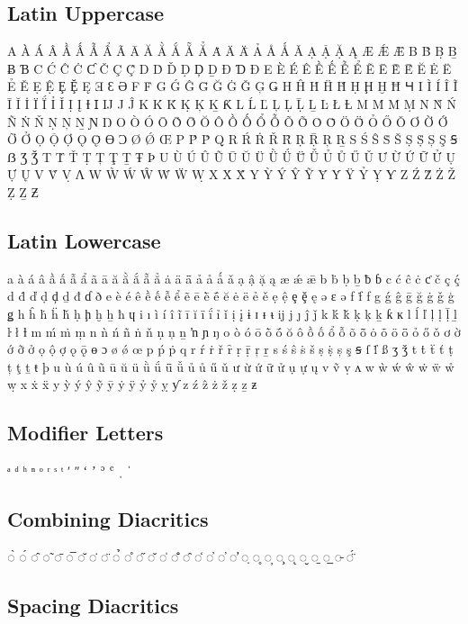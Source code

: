 
\subsection{Latin Uppercase}

A À Á Â Ầ Ấ Ẫ Ẩ Ã Ā Ă Ằ Ắ Ẵ Ẳ Ȧ Ä Ǟ Ả Å Ǻ Ǎ Ạ Ậ Ặ Ą Æ Ǽ Ǣ B Ḃ Ḅ Ḇ Ƀ Ɓ C Ć Ĉ Ċ Ƈ Č Ç Ḉ D Ḋ Ď Ḍ Ḑ Ḏ Đ Ɗ Ð E È É Ê Ề Ế Ễ Ể Ẽ Ē Ḕ Ḗ Ĕ Ė Ë Ẻ Ě Ẹ Ệ Ȩ Ḝ Ę Ǝ Ɛ Ə F Ḟ G Ǵ Ĝ Ḡ Ğ Ġ Ǧ Ģ Ǥ H Ĥ Ḣ Ḧ Ȟ Ḥ Ḩ Ḫ Ħ Ɥ I Ì Í Î Ĩ Ī Ĭ İ Ï Ḯ Ỉ Ǐ Ị Į Ɨ Ɪ Ĳ J Ĵ K Ḱ Ǩ Ḳ Ķ Ḵ Ƙ L Ĺ Ľ Ļ Ḷ Ḹ Ḻ Ŀ Ł Ƚ M Ḿ Ṁ Ṃ N Ǹ Ń Ñ Ṅ Ň Ṇ Ņ Ṉ Ɲ Ŋ O Ò Ó Ō Ṑ Ṓ Ŏ Ô Ồ Ố Ổ Ỗ Õ Ȭ Ȯ Ȱ Ö Ȫ Ỏ Ő Ǒ Ơ Ờ Ớ Ỡ Ở Ọ Ộ Ợ Ǫ Ǭ Ɵ Ɔ Ø Ǿ Œ P Ṕ Ṗ Q R Ŕ Ṙ Ř Ȓ Ṛ Ṝ Ŗ Ṟ S Ś Ŝ Ṡ Š Ṣ Ṩ Ș Ş Ꞩ ẞ Ʒ Ǯ T Ṫ Ť Ṭ Ț Ţ Ṯ Ŧ Þ U Ù Ú Û Ũ Ū Ŭ Ü Ǜ Ǘ Ǖ Ǚ Ủ Ů Ű Ǔ Ư Ừ Ứ Ữ Ử Ụ Ự Ų V Ṽ Ṿ Ʌ W Ẁ Ẃ Ŵ Ẇ Ẅ Ẉ X Ẋ Ẍ Y Ỳ Ý Ŷ Ỹ Ȳ Ẏ Ÿ Ỷ Ỵ Ƴ Z Ź Ẑ Ż Ž Ẓ Ẕ Ƶ

\subsection{Latin Lowercase}

a à á â ầ ấ ẫ ẩ ã ā ă ằ ắ ẵ ẳ ȧ ä ǟ ả å ǻ ǎ ạ ậ ặ ą æ ǽ ǣ b ḃ ḅ ḇ ƀ ɓ c ć ĉ ċ ƈ č ç ḉ d ḋ ď ḍ ḑ ḏ đ ɗ ð e è é ê ề ế ễ ể ẽ ē ḕ ḗ ĕ ė ë ẻ ě ẹ ệ ȩ ḝ ę ǝ ɛ ə f ḟ ƒ g ǵ ĝ ḡ ğ ġ ǧ ģ ǥ h ĥ ḣ ḧ ȟ ḥ ḩ ḫ ẖ ħ ɥ i ı ì í î ĩ ī ĭ ï ḯ ỉ ǐ ị į ɨ ɪ ᵻ ᵼ ĳ j ȷ ĵ ǰ k ḱ ǩ ḳ ķ ḵ ƙ ĸ l ĺ ľ ļ ḷ ḹ ḻ ŀ ł ƚ m ḿ ṁ ṃ n ǹ ń ñ ṅ ň ṇ ņ ṉ ŉ ɲ ŋ o ò ó ō ṑ ṓ ŏ ô ồ ố ổ ỗ õ ȭ ȯ ȱ ö ȫ ỏ ő ǒ ơ ờ ớ ỡ ở ọ ộ ợ ǫ ǭ ɵ ɔ ø ǿ œ p ṕ ṗ q r ŕ ṙ ř ȓ ṛ ṝ ŗ ṟ s ś ŝ ṡ š ṣ ṩ ș ş ꞩ ſ ẛ ß ʒ ǯ t ṫ ẗ ť ṭ ț ţ ṯ ŧ þ u ù ú û ũ ū ŭ ü ǜ ǘ ǖ ǚ ủ ů ű ǔ ư ừ ứ ữ ử ụ ự ų v ṽ ṿ ʌ w ẁ ẃ ŵ ẇ ẅ ẘ ẉ x ẋ ẍ y ỳ ý ŷ ỹ ȳ ẏ ÿ ỷ ẙ ỵ ƴ z ź ẑ ż ž ẓ ẕ ƶ

\subsection{Modifier Letters}

ᵃ ᵈ ʰ ⁿ ᵒ ʳ ˢ ᵗ ʹ ʺ ʻ ʼ ʾ ʿ ˌ ˈ

\subsection{Combining Diacritics}

◌̀ ◌́ ◌̂ ◌̃ ◌̄ ◌̅ ◌̆ ◌̇ ◌̈ ◌̉ ◌̊ ◌̋ ◌̌ ◌̍ ◌̐ ◌̑ ◌̒ ◌̓ ◌̕ ◌̛ ◌̣ ◌̥ ◌̦ ◌̧ ◌̨ ◌̮ ◌̱ ◌̲ ◌̵ ◌̈́

\subsection{Spacing Diacritics}

